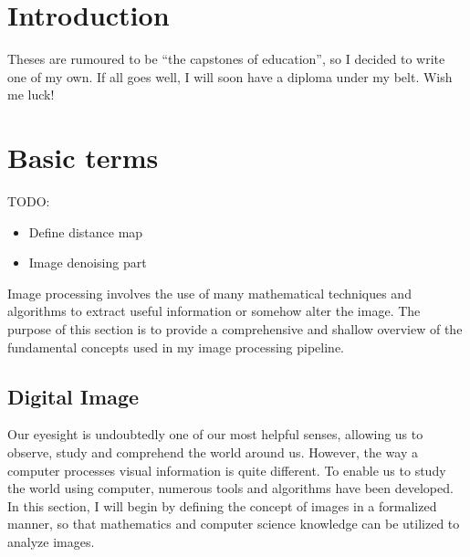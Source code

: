 \documentclass[
  digital,     %
  oneside,     %
  nosansbold,  %
  nocolorbold, %
  lof,         %
  lot,         %
]{fithesis4}
\begin{document}
\chapter*{Introduction}

Theses are rumoured to be \enquote{the capstones of education}, so
I decided to write one of my own. If all goes well, I will soon
have a diploma under my belt. Wish me luck!

\chapter{Basic terms}

TODO:
\begin{itemize}
    \item{Define distance map}
    \item{Image denoising part}
\end{itemize}

Image processing involves the use of many mathematical techniques and algorithms
to extract useful information or somehow alter the image. The purpose of this
section is to provide a comprehensive and shallow overview of the fundamental
concepts used in my image processing pipeline.

\section{Digital Image}
Our eyesight is undoubtedly one of our most helpful senses, allowing us to
observe, study and comprehend the world around us. However, the way a computer
processes visual information is quite different. To enable us to study the world
using computer, numerous tools and algorithms have been developed. In this
section, I will begin by defining the concept of images in a formalized manner,
so that mathematics and computer science knowledge can be utilized to analyze
images.
\end{document}

